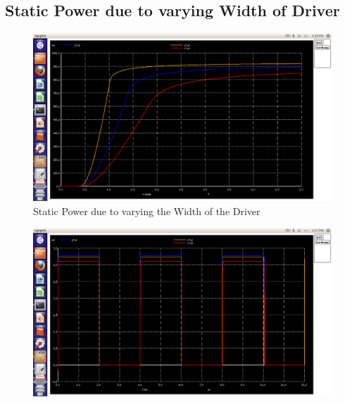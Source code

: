 \documentclass[12pt,a4paper]{article}
\begin{document}
\begin{center}
\subsection{Static Power due to varying Width of Driver}
\begin{figure}[!ht]
\centering
\includegraphics[scale=0.37]{lab4_pic4_11_static_power_dueto_varing_wof_driver.png}

\caption[Short]{Static Power due to varying the Width of the Driver}
\end{figure}

\begin{figure}[!ht]
\centering
\includegraphics[scale=0.37]{lab4_pic4_12_dynamic_power_dueto_varing_Lof_driver.png}


\end{figure}
\end{center}
\end{document}
